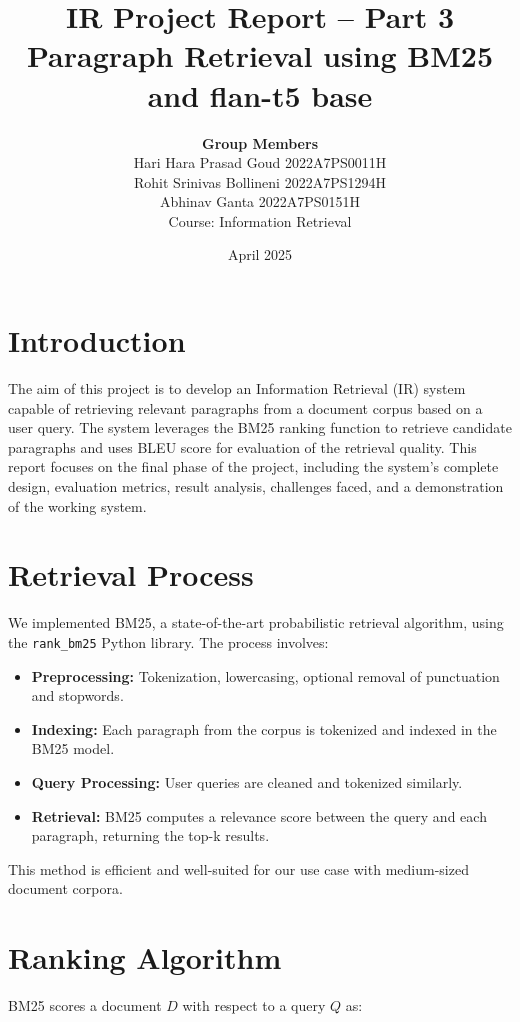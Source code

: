 \documentclass[12pt]{article}
\title{\textbf{IR Project Report – Part 3} \\ \large Paragraph Retrieval using BM25 and flan-t5 base }
\author{\textbf{Group Members} \\Hari Hara Prasad Goud    2022A7PS0011H\\Rohit Srinivas Bollineni    2022A7PS1294H\\Abhinav Ganta    2022A7PS0151H\\ Course: Information Retrieval}
\date{April 2025}
\begin{document}
\maketitle

\section{Introduction}

The aim of this project is to develop an Information Retrieval (IR) system capable of retrieving relevant paragraphs from a document corpus based on a user query. The system leverages the BM25 ranking function to retrieve candidate paragraphs and uses BLEU score for evaluation of the retrieval quality. This report focuses on the final phase of the project, including the system's complete design, evaluation metrics, result analysis, challenges faced, and a demonstration of the working system.

\section{Retrieval Process}

We implemented BM25, a state-of-the-art probabilistic retrieval algorithm, using the \texttt{rank\_bm25} Python library. The process involves:

\begin{itemize}[noitemsep]
    \item \textbf{Preprocessing:} Tokenization, lowercasing, optional removal of punctuation and stopwords.
    \item \textbf{Indexing:} Each paragraph from the corpus is tokenized and indexed in the BM25 model.
    \item \textbf{Query Processing:} User queries are cleaned and tokenized similarly.
    \item \textbf{Retrieval:} BM25 computes a relevance score between the query and each paragraph, returning the top-k results.
\end{itemize}

This method is efficient and well-suited for our use case with medium-sized document corpora.

\section{Ranking Algorithm}

BM25 scores a document \( D \) with respect to a query \( Q \) as:
\end{document}

